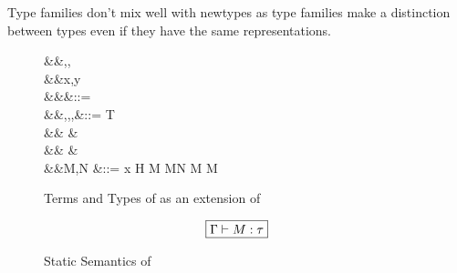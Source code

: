 \documentclass[manuscript,screen,nonacm]{acmart}
\begin{document}
Type families don't mix well with newtypes as type families make a distinction between types
even if they have the same representations.


\begin{figure}[ht]
  \centering
  \begin{syntax}
     &&\alpha,\beta,\gamma \\
     &&x,y          \\
         &&\kappa                  &::= \star \mid \kappa \to \kappa \mid \syntaxhl{\tau \sim \sigma}\\
         &&\tau,\sigma,\gamma,\nu  &::= \alpha \mid T \mid {} \mid \tau \to \tau \mid \Forall {\alpha\co\kappa} \tau\\
    &&                        &\syntaxhl{\mid \sym \Co \mid \trans \nu \Co \mid \Co\At\tau \mid \left \Co \mid \right \Co} \\
    &&                        &\syntaxhl{\mid \leftc \Co \mid \rightc \Co \mid \Cast \Co \Co}\\
         &&M,N                     &::= x \mid H \mid {} M \mid M\App N \mid \TLam{\tau\co\kappa} M \mid M\App \tau
  \end{syntax}
  \caption{Terms and Types of \SFR as an extension of \SFC}
  \label{fig:system-fcr-syntax}
\end{figure}

\begin{figure}[ht]
  \centering
  \begin{gather*}
    \fbox{$\Gamma \vdash M : \tau$}
  \end{gather*}
  \caption{Static Semantics of \SFR}
  \label{fig:sfr-typing}
\end{figure}
\end{document}
